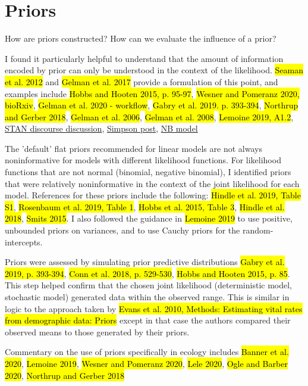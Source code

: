 \documentclass[12pt, oneside, titlepage]{article}   	%
\begin{document}
\section*{Priors}

How are priors constructed? How can we evaluate the influence of a prior?

I found it particularly helpful to understand that the amount of information encoded by prior can only be understood in the context of the likelihood. \hl{Seaman et al. 2012} and \hl{Gelman et al. 2017} provide a formulation of this point, and examples include \hl{Hobbs and Hooten 2015, p. 95-97}, \hl{Wesner and Pomeranz 2020, bioRxiv}, \hl{Gelman et al. 2020 - workflow}, \hl{Gabry et al. 2019. p. 393-394}, \hl{Northrup and Gerber 2018}, \hl{Gelman et al. 2006}, \hl{Gelman et al. 2008}, \hl{Lemoine 2019, A1.2}, \href{https://discourse.mc-stan.org/t/choosing-weakly-informative-priors-for-population-level-effects-in-a-poisson-glmm/18008/5}{STAN discourse discussion}, \href{https://statmodeling.stat.columbia.edu/2018/09/12/against-arianism-2-arianism-grande/}{Simpson post}, \href{https://www.flutterbys.com.au/stats/tut/tut10.6b.html#h4_47}{NB model}

The 'default' flat priors recommended for linear models are not always noninformative for models with different likelihood functions. For likelihood functions that are not normal (binomial, negative binomial), I identified priors that were relatively noninformative in the context of the joint likelihood for each model. References for these priors include the following: \hl{Hindle et al. 2019, Table S1}, \hl{Rosenbaum et al. 2019, Table 1}, \hl{Hobbs et al. 2015, Table 3}, \hl{Hindle et al. 2018}, \hl{Smits 2015}. I also followed the guidance in \hl{Lemoine 2019} to use positive, unbounded priors on variances, and to use Cauchy priors for the random-intercepts. 

Priors were assessed by simulating prior predictive distributions \hl{Gabry et al. 2019, p. 393-394}, \hl{Conn et al. 2018, p. 529-530}, \hl{Hobbs and Hooten 2015, p. 85}. This step helped confirm that the chosen joint likelihood (deterministic model, stochastic model) generated data within the observed range. This is similar in logic to the approach taken by \hl{Evans et al. 2010, Methods: Estimating vital rates from demographic data: Priors} except in that case the authors compared their observed means to those generated by their priors.

Commentary on the use of priors specifically in ecology includes \hl{Banner et al. 2020}, \hl{Lemoine 2019}, \hl{Wesner and Pomeranz 2020}, \hl{Lele 2020}, \hl{Ogle and Barber 2020}, \hl{Northrup and Gerber 2018}
\end{document}
